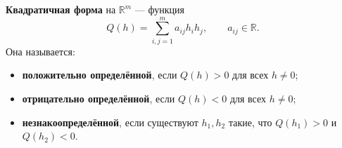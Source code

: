 \label{definition:02}

\begin{definition}
\textbf{Квадратичная форма} на $\mathbb R^m$ --- функция
\[
  Q(h)=\sum_{i,j=1}^{m}a_{ij}h_i h_j,
  \qquad a_{ij}\in\mathbb R.
\]
Она называется:
\begin{itemize}
  \item \textbf{положительно определённой}, если $Q(h)>0$ для всех $h\ne0$;
  \item \textbf{отрицательно определённой}, если $Q(h)<0$ для всех $h\ne0$;
  \item \textbf{незнакоопределённой}, если существуют $h_1,h_2$ такие, что $Q(h_1)>0$ и $Q(h_2)<0$.
\end{itemize}
\end{definition}
